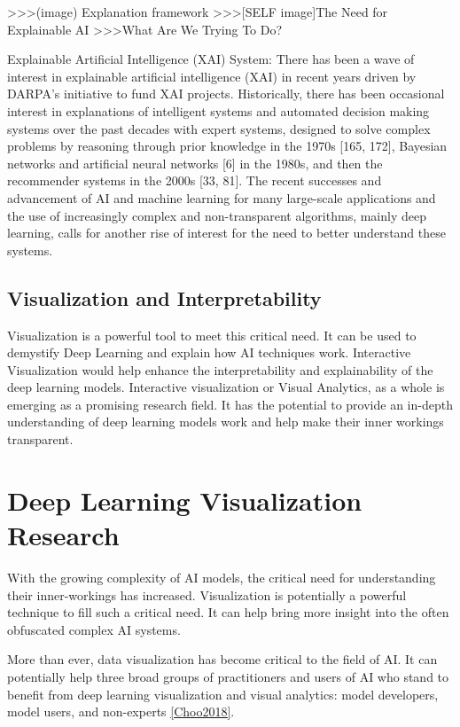 >>>(image) Explanation framework
>>>[SELF image]The Need for Explainable AI
>>>What Are We Trying To Do?

Explainable Artificial Intelligence (XAI) System:  There has been a wave of interest in explainable artificial intelligence (XAI) in recent years driven by DARPA’s initiative to fund XAI projects. Historically, there has been occasional interest in explanations of intelligent systems and automated decision making systems over the past decades with expert systems, designed to solve complex problems by reasoning through prior knowledge in the 1970s [165, 172], Bayesian networks and artificial neural networks [6] in the 1980s, and then the recommender systems in the 2000s [33, 81]. The recent successes and advancement of AI and machine learning for many large-scale applications and the use of increasingly complex and non-transparent algorithms, mainly deep learning, calls for another rise of interest for the need to better understand these systems.

\subsection{Visualization and Interpretability}

Visualization is a powerful tool to meet this critical need. It can be used to demystify Deep Learning and explain how AI techniques work. Interactive Visualization would help enhance the interpretability and explainability of the deep learning models. Interactive visualization or Visual Analytics, as a whole is emerging as a promising research field. It has the potential to provide an in-depth understanding of deep learning models work and help make their inner workings transparent.

\section{Deep Learning Visualization Research}

With the growing complexity of AI models, the critical need for understanding their inner-workings has increased. Visualization is potentially a powerful technique to fill such a critical need. It can help bring more insight into the often obfuscated complex AI systems.

More than ever, data visualization has become critical to the field of AI. It can potentially help three broad groups of practitioners and users of AI who stand to benefit from deep learning visualization and visual analytics: model developers, model users, and non-experts \ref{Choo2018}.

